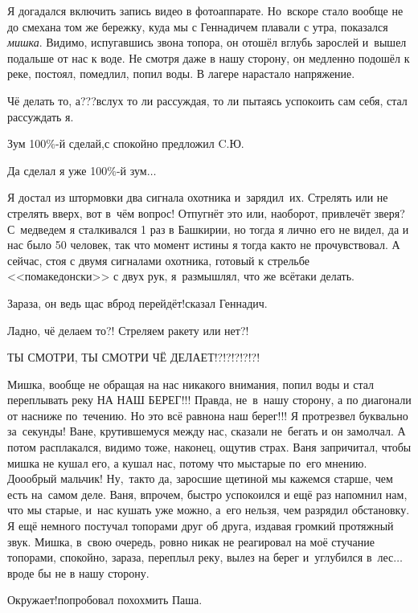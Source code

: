 Я догадался включить запись видео в фотоаппарате. Но~вскоре стало вообще не до смеха\mdash на том же бережку, куда мы с Геннадичем плавали с утра, показался \textit{мишка}. Видимо, испугавшись звона топора, он отошёл вглубь зарослей и~вышел подальше от нас к воде. Не смотря даже в нашу сторону, он медленно подошёл к реке, постоял, помедлил, попил воды. В лагере нарастало напряжение. 

\diagdash Чё делать то, а???\mdash вслух то ли рассуждая, то ли пытаясь успокоить сам себя, стал рассуждать я.

\diagdash Зум 100\%-й сделай,с спокойно предложил C.Ю.

\diagdash Да сделал я уже 100\%-й зум$\ldots$

Я достал из штормовки два сигнала охотника и~зарядил~их. Стрелять или не стрелять вверх, вот в~чём вопрос! Отпугнёт это или, наоборот, привлечёт зверя? С~медведем я сталкивался 1 раз в Башкирии, но тогда я лично его не видел, да и нас было 50 человек, так что момент истины я тогда как\sdash то не прочувствовал. А сейчас, стоя с двумя сигналами охотника, готовый к стрельбе <<по\sdash македонски>> с двух рук, я~размышлял, что же всё\sdash таки делать. 

\diagdash Зараза, он ведь щас вброд перейдёт!\mdash сказал Геннадич.

\diagdash Ладно, чё делаем то?! Стреляем ракету или нет?!

\diagdash ТЫ СМОТРИ, ТЫ СМОТРИ ЧЁ ДЕЛАЕТ!?!?!?!?!?!

Мишка, вообще не обращая на нас никакого внимания, попил воды и стал переплывать реку НА НАШ БЕРЕГ!!! Правда, не~в~нашу сторону, а по диагонали от нас\mdash ниже по~течению. Но это всё равно\mdash на наш берег!!! Я протрезвел буквально за~секунды! Ване, крутившемуся между нас, сказали не~бегать и он замолчал. А потом расплакался, видимо тоже, наконец, ощутив страх. Ваня запричитал, чтобы мишка не кушал его, а кушал нас, потому что мы\mdash старые по~его мнению. До\sdash о\sdash о\sdash брый мальчик! Ну,~так\sdash то да, заросшие щетиной мы кажемся старше, чем есть на~самом деле. Ваня, впрочем, быстро успокоился и ещё раз напомнил нам, что мы старые, и~нас кушать уже можно, а~его нельзя, чем разрядил обстановку. Я ещё немного постучал топорами друг об друга, издавая громкий протяжный звук. Мишка, в~свою очередь, ровно никак не реагировал на моё стучание топорами, спокойно, зараза, переплыл реку, вылез на берег и~углубился в~лес$\ldots$ вроде бы не в нашу сторону. 

\diagdash Окружает!\mdash попробовал похохмить Паша.

